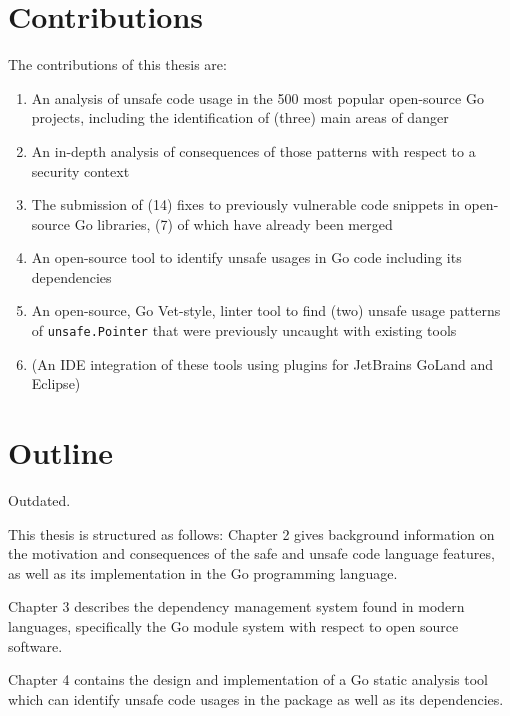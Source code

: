 
\section{Contributions}\label{sec:contributions}

The contributions of this thesis are:

\begin{enumerate}
    \item An analysis of unsafe code usage in the 500 most popular open-source Go projects,
    including the identification of (three) main areas of danger
    \item An in-depth analysis of consequences of those patterns with respect to a security
    context
    \item The submission of (14) fixes to previously vulnerable code snippets in open-source Go
    libraries, (7) of which have already been merged
    \item An open-source tool to identify unsafe usages in Go code including its dependencies
    \item An open-source, Go Vet-style, linter tool to find (two) unsafe usage patterns of \texttt{unsafe.Pointer}
    that were previously uncaught with existing tools
    \item (An IDE integration of these tools using plugins for JetBrains GoLand and Eclipse)
\end{enumerate}




\section{Outline}\label{sec:outline}

Outdated.

This thesis is structured as follows: Chapter 2 gives background information on the motivation
and consequences of the safe and unsafe code language features, as well as its implementation
in the Go programming language.

Chapter 3 describes the dependency management system found in modern languages, specifically
the Go module system with respect to open source software.

Chapter 4 contains the design and implementation of a Go static analysis tool which can identify
unsafe code usages in the package as well as its dependencies.

